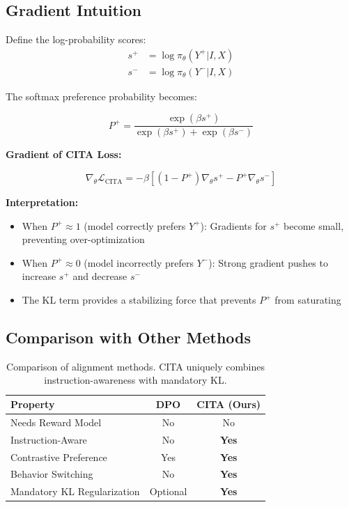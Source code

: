 \subsection{Gradient Intuition}

Define the log-probability scores:
\begin{align}
s^+ &= \log \pi_\theta(Y^+ | I, X) \\
s^- &= \log \pi_\theta(Y^- | I, X)
\end{align}

The softmax preference probability becomes:

\begin{equation}
P^+ = \frac{\exp(\beta s^+)}{\exp(\beta s^+) + \exp(\beta s^-)}
\label{eq:softmax_pref}
\end{equation}

\textbf{Gradient of CITA Loss:}

\begin{equation}
\nabla_\theta \mathcal{L}_{\text{CITA}} = -\beta \left[(1 - P^+)\nabla_\theta s^+ - P^+ \nabla_\theta s^-\right]
\label{eq:cita_gradient}
\end{equation}

\textbf{Interpretation:}
\begin{itemize}[leftmargin=*,itemsep=1pt]
    \item When $P^+ \approx 1$ (model correctly prefers $Y^+$): Gradients for $s^+$ become small, preventing over-optimization
    \item When $P^+ \approx 0$ (model incorrectly prefers $Y^-$): Strong gradient pushes to increase $s^+$ and decrease $s^-$
    \item The KL term provides a stabilizing force that prevents $P^+$ from saturating
\end{itemize}

\subsection{Comparison with Other Methods}

\begin{table}[H]
\centering
\small
\begin{tabular}{@{}lcc@{}}
\toprule
\textbf{Property} & \textbf{DPO} & \textbf{CITA (Ours)} \\
\midrule
Needs Reward Model & No & No \\
\hline
Instruction-Aware & No & \textbf{Yes} \\
\hline
Contrastive Preference & Yes & \textbf{Yes} \\
\hline
Behavior Switching & No & \textbf{Yes} \\
\hline
Mandatory KL Regularization & Optional & \textbf{Yes} \\
\bottomrule
\end{tabular}
\caption{Comparison of alignment methods. CITA uniquely combines instruction-awareness with mandatory KL.}
\label{tab:method_comparison_appendix}
\end{table}

